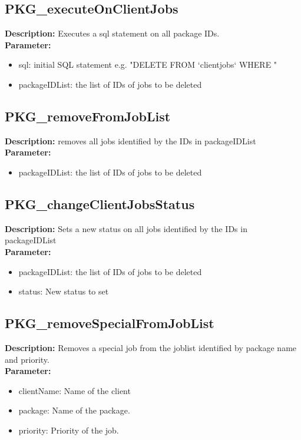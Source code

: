 \subsection{PKG\_executeOnClientJobs}
\textbf{Description:} Executes a sql statement on all package IDs.\\
\textbf{Parameter:}
\begin{itemize}
\item sql: initial SQL statement e.g. "DELETE FROM `clientjobs` WHERE "
\item packageIDList: the list of IDs of jobs to be deleted
\end{itemize}

\subsection{PKG\_removeFromJobList}
\textbf{Description:} removes all jobs identified by the IDs in packageIDList\\
\textbf{Parameter:}
\begin{itemize}
\item packageIDList: the list of IDs of jobs to be deleted
\end{itemize}

\subsection{PKG\_changeClientJobsStatus}
\textbf{Description:} Sets a new status on all jobs identified by the IDs in packageIDList\\
\textbf{Parameter:}
\begin{itemize}
\item packageIDList: the list of IDs of jobs to be deleted
\item status: New status to set
\end{itemize}

\subsection{PKG\_removeSpecialFromJobList}
\textbf{Description:} Removes a special job from the joblist identified by package name and priority.\\
\textbf{Parameter:}
\begin{itemize}
\item clientName: Name of the client
\item package: Name of the package.
\item priority: Priority of the job.
\end{itemize}

